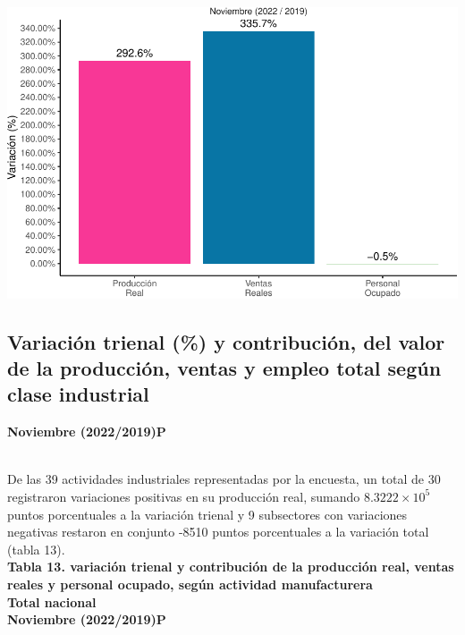 \documentclass[
]{article}
\begin{document}
\includegraphics{boletin_files/figure-latex/variacion_trienal_plot-1.pdf}

\hypertarget{variaciuxf3n-trienal-y-contribuciuxf3n-del-valor-de-la-producciuxf3n-ventas-y-empleo-total-seguxfan-clase-industrial}{%
\subsection{Variación trienal (\%) y contribución, del valor de la
producción, ventas y empleo total según clase
industrial}\label{variaciuxf3n-trienal-y-contribuciuxf3n-del-valor-de-la-producciuxf3n-ventas-y-empleo-total-seguxfan-clase-industrial}}

\textbf{Noviembre (2022/2019)P}\\
\strut \\
De las 39 actividades industriales representadas por la encuesta, un
total de 30 registraron variaciones positivas en su producción real,
sumando \ensuremath{8.3222\times 10^{5}} puntos porcentuales a la
variación trienal y 9 subsectores con variaciones negativas restaron en
conjunto -8510 puntos porcentuales a la variación total (tabla 13).\\
\textbf{Tabla 13. variación trienal y contribución de la producción
real, ventas reales y personal ocupado, según actividad manufacturera}\\
\textbf{Total nacional}\\
\textbf{Noviembre (2022/2019)P}\\
\end{document}
